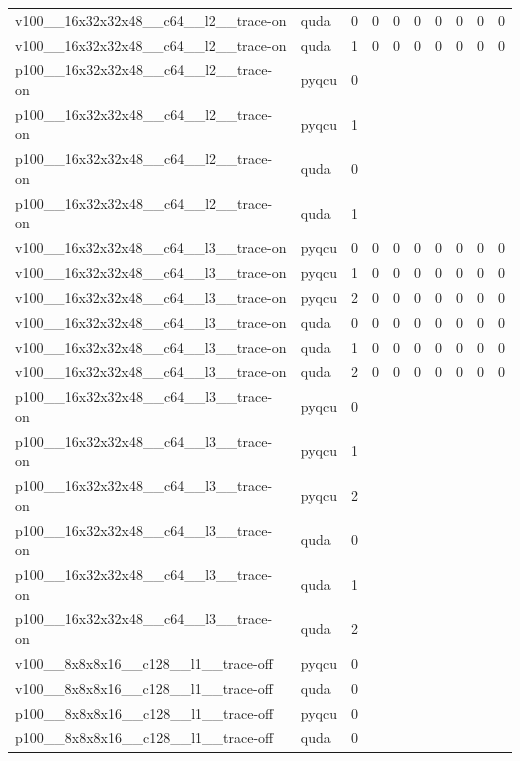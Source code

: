 \begin{table}[htbp]
\begin{tabular}{@{}llrrrrrrrr@{}}
v100\_\_16x32x32x48\_\_c64\_\_l2\_\_trace-on & quda & 0 & 0 & 0 & 0 & 0 & 0 & 0 & 0 \\
v100\_\_16x32x32x48\_\_c64\_\_l2\_\_trace-on & quda & 1 & 0 & 0 & 0 & 0 & 0 & 0 & 0 \\
p100\_\_16x32x32x48\_\_c64\_\_l2\_\_trace-on & pyqcu & 0 &  &  &  &  &  &  &  \\
p100\_\_16x32x32x48\_\_c64\_\_l2\_\_trace-on & pyqcu & 1 &  &  &  &  &  &  &  \\
p100\_\_16x32x32x48\_\_c64\_\_l2\_\_trace-on & quda & 0 &  &  &  &  &  &  &  \\
p100\_\_16x32x32x48\_\_c64\_\_l2\_\_trace-on & quda & 1 &  &  &  &  &  &  &  \\
v100\_\_16x32x32x48\_\_c64\_\_l3\_\_trace-on & pyqcu & 0 & 0 & 0 & 0 & 0 & 0 & 0 & 0 \\
v100\_\_16x32x32x48\_\_c64\_\_l3\_\_trace-on & pyqcu & 1 & 0 & 0 & 0 & 0 & 0 & 0 & 0 \\
v100\_\_16x32x32x48\_\_c64\_\_l3\_\_trace-on & pyqcu & 2 & 0 & 0 & 0 & 0 & 0 & 0 & 0 \\
v100\_\_16x32x32x48\_\_c64\_\_l3\_\_trace-on & quda & 0 & 0 & 0 & 0 & 0 & 0 & 0 & 0 \\
v100\_\_16x32x32x48\_\_c64\_\_l3\_\_trace-on & quda & 1 & 0 & 0 & 0 & 0 & 0 & 0 & 0 \\
v100\_\_16x32x32x48\_\_c64\_\_l3\_\_trace-on & quda & 2 & 0 & 0 & 0 & 0 & 0 & 0 & 0 \\
p100\_\_16x32x32x48\_\_c64\_\_l3\_\_trace-on & pyqcu & 0 &  &  &  &  &  &  &  \\
p100\_\_16x32x32x48\_\_c64\_\_l3\_\_trace-on & pyqcu & 1 &  &  &  &  &  &  &  \\
p100\_\_16x32x32x48\_\_c64\_\_l3\_\_trace-on & pyqcu & 2 &  &  &  &  &  &  &  \\
p100\_\_16x32x32x48\_\_c64\_\_l3\_\_trace-on & quda & 0 &  &  &  &  &  &  &  \\
p100\_\_16x32x32x48\_\_c64\_\_l3\_\_trace-on & quda & 1 &  &  &  &  &  &  &  \\
p100\_\_16x32x32x48\_\_c64\_\_l3\_\_trace-on & quda & 2 &  &  &  &  &  &  &  \\
v100\_\_8x8x8x16\_\_c128\_\_l1\_\_trace-off & pyqcu & 0 &  &  &  &  &  &  &  \\
v100\_\_8x8x8x16\_\_c128\_\_l1\_\_trace-off & quda & 0 &  &  &  &  &  &  &  \\
p100\_\_8x8x8x16\_\_c128\_\_l1\_\_trace-off & pyqcu & 0 &  &  &  &  &  &  &  \\
p100\_\_8x8x8x16\_\_c128\_\_l1\_\_trace-off & quda & 0 &  &  &  &  &  &  &  \\

\end{tabular}
\end{table}
